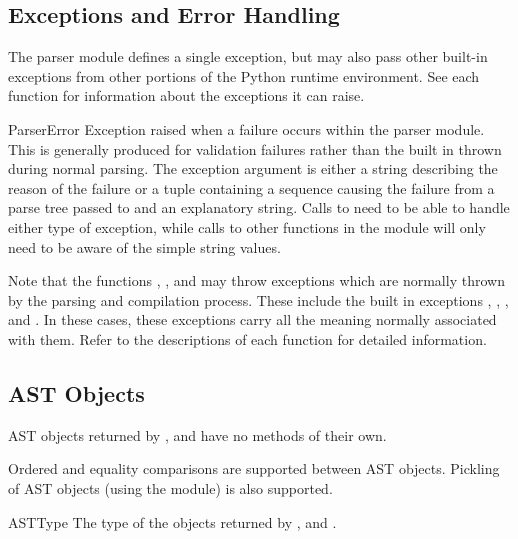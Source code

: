 \subsection{Exceptions and Error Handling}
\label{AST Errors}

The parser module defines a single exception, but may also pass other
built-in exceptions from other portions of the Python runtime
environment.  See each function for information about the exceptions
it can raise.

\begin{excdesc}{ParserError}
Exception raised when a failure occurs within the parser module.  This
is generally produced for validation failures rather than the built in
 thrown during normal parsing.
The exception argument is either a string describing the reason of the
failure or a tuple containing a sequence causing the failure from a parse
tree passed to  and an explanatory string.  Calls to
 need to be able to handle either type of exception,
while calls to other functions in the module will only need to be
aware of the simple string values.
\end{excdesc}

Note that the functions , , and
 may throw exceptions which are normally thrown by the
parsing and compilation process.  These include the built in
exceptions , ,
, and .  In these cases, these
exceptions carry all the meaning normally associated with them.  Refer
to the descriptions of each function for detailed information.


\subsection{AST Objects}
\label{AST Objects}

AST objects returned by ,  and
 have no methods of their own.

Ordered and equality comparisons are supported between AST objects.
Pickling of AST objects (using the  module) is also
supported.

\begin{datadesc}{ASTType}
The type of the objects returned by ,
 and .
\end{datadesc}


